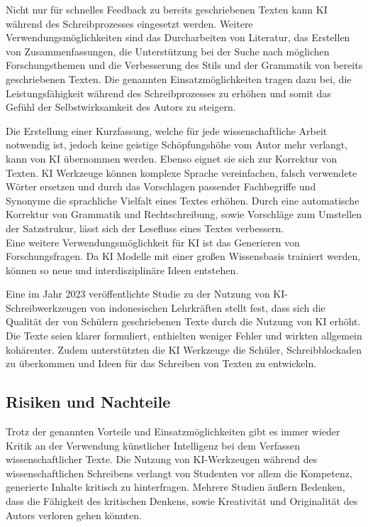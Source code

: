 \documentclass[../main.tex]{subfiles}
\begin{document}
Nicht nur für schnelles Feedback zu bereits geschriebenen Texten kann KI während des Schreibprozesses eingesetzt werden. 
Weitere Verwendungsmöglichkeiten sind das Durcharbeiten von Literatur, das Erstellen von Zusammenfassungen, die Unterstützung bei der Suche nach 
möglichen Forschungsthemen und die Verbesserung des Stils und der Grammatik von bereits geschriebenen Texten. Die genannten Einsatzmöglichkeiten 
tragen dazu bei, die Leistungsfähigkeit während des Schreibprozesses zu erhöhen und somit das Gefühl der Selbstwirksamkeit des Autors zu steigern.\cite{SelfEfficacyBeliefs}

Die Erstellung einer Kurzfassung, welche für jede wissenschaftliche Arbeit notwendig ist, jedoch keine geistige Schöpfungshöhe vom Autor mehr verlangt, 
kann von KI übernommen werden. Ebenso eignet sie sich zur Korrektur von Texten. KI Werkzeuge können komplexe Sprache vereinfachen, falsch 
verwendete Wörter ersetzen und durch das Vorschlagen passender Fachbegriffe und Synonyme die sprachliche Vielfalt eines Textes erhöhen. Durch eine 
automatische Korrektur von Grammatik und Rechtschreibung, sowie Vorschläge zum Umstellen der Satzstrukur, lässt sich der Lesefluss eines Textes verbessern.\cite{ZukunftWissenschaftlichesPublizieren,teachers}\\
Eine weitere Verwendungsmöglichkeit für KI ist das Generieren von Forschungsfragen. Da KI Modelle mit einer großen Wissensbasis trainiert werden, 
können so neue und interdisziplinäre Ideen entstehen.\cite{ZukunftWissenschaftlichesPublizieren,humanWritingToAi}

Eine im Jahr 2023 veröffentlichte Studie zu der Nutzung von KI-Schreibwerkzeugen von indonesischen Lehrkräften stellt fest, dass sich die Qualität der von 
Schülern geschriebenen Texte durch die Nutzung von KI erhöht. Die Texte seien klarer formuliert, enthielten weniger Fehler und 
wirkten allgemein kohärenter. Zudem unterstützten die KI Werkzeuge die Schüler, Schreibblockaden zu überkommen und Ideen für das Schreiben von Texten zu entwickeln.\cite{teachers} 

\subsection{Risiken und Nachteile}

Trotz der genannten Vorteile und Einsatzmöglichkeiten gibt es immer wieder Kritik an der Verwendung künstlicher Intelligenz bei dem Verfassen wissenschaftlicher Texte. 
Die Nutzung von KI-Werkzeugen während des wissenschaftlichen Schreibens verlangt von Studenten vor allem die Kompetenz, generierte Inhalte kritisch zu 
hinterfragen. Mehrere Studien äußern Bedenken, dass die Fähigkeit des kritischen Denkens, sowie Kreativität und Originalität des Autors verloren gehen könnten.\cite{ZukunftWissenschaftlichesPublizieren,teachers,BucherSchwarzerHolzwweißig}
\end{document}
